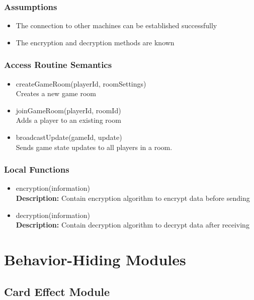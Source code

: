\documentclass[12pt, titlepage]{article}
\begin{document}
\subsubsection{Assumptions}
\begin{itemize}
\item The connection to other machines can be established successfully
\item The encryption and decryption methods are known
\end{itemize}

\subsubsection{Access Routine Semantics}

\begin{itemize}
\item createGameRoom(playerId, roomSettings)\\
Creates a new game room


\item joinGameRoom(playerId, roomId)\\
Adds a player to an existing room

\item broadcastUpdate(gameId, update)\\
Sends game state updates to all players in a room.

\end{itemize}


\subsubsection{Local Functions}
\begin{itemize}
\item encryption(information)\\
\textbf{Description:} Contain encryption algorithm to encrypt data before sending
\item decryption(information)\\ 
\textbf{Description:} Contain decryption algorithm to decrypt data after receiving
\end{itemize}

\section{Behavior-Hiding Modules}

\subsection{Card Effect Module}
\end{document}
